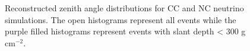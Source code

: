 \begin{figure}[h!]
  \centering
  \hfill
  \caption{Reconstructed zenith angle distributions for CC and NC neutrino simulations. The open histograms represent all events while the purple filled histograms represent events with slant depth < 300 g cm$^{-2}$.}
  \label{fig:Rec_Theta}
\end{figure}

